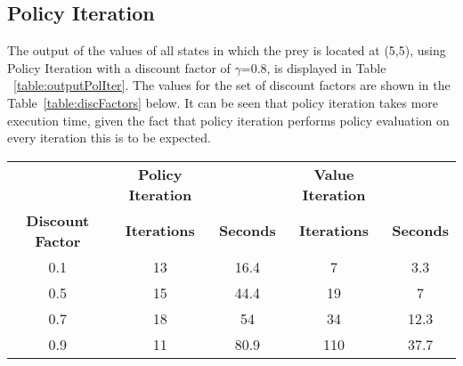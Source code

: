 \documentclass[11pt]{article}
\begin{document}
\subsection{Policy Iteration}
The output of the values of all states in which the prey is located at (5,5), using Policy Iteration with a discount factor of $\gamma$=0.8, is displayed in Table ~\ref{table:outputPolIter}.
The values for the set of discount factors are shown in the Table~\ref{table:discFactors} below. It can be seen that policy iteration takes more execution time, given the fact that policy iteration performs policy evaluation on every iteration this is to be expected.
\begin{center}
\begin{table*}[ht]
{\small
\hfill{}
\begin{tabular}{c|c|c|c|c}
 &  \textbf{Policy Iteration} &  & \textbf{Value Iteration} &\\
\textbf{Discount Factor} &  \textbf{Iterations} & \textbf{Seconds} & \textbf{Iterations} & \textbf{Seconds}\\
	\hline
0.1 & 13 & 16.4 & 7 & 3.3\\
0.5 & 15 & 44.4 & 19& 7\\
0.7 & 18 & 54 & 34& 12.3\\
0.9 & 11 & 80.9 & 110& 37.7\\
\end{tabular}}
\hfill{}
\caption{Number of iterations and execution time for different discount factors.}
\label{table:discFactors}
\end{table*}
\end{center}
\end{document}
